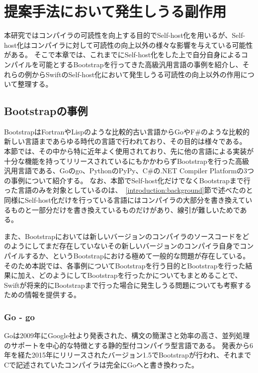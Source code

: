 \chapter{提案手法において発生しうる副作用}
\label{side-effect}

本研究ではコンパイラの可読性を向上する目的でSelf-host化を用いるが、Self-host化はコンパイラに対して可読性の向上以外の様々な影響を与えている可能性がある。
そこで本章では、これまでにSelf-host化をした上で自分自身によるコンパイルを可能とするBootstrapを行ってきた高級汎用言語の事例を紹介し、それらの例からSwiftのSelf-host化において発生しうる可読性の向上以外の作用について整理する。

\section{Bootstrapの事例}
\label{side-effect:instance}

BootstrapはFortranやLispのような比較的古い言語からGoやF\#のような比較的新しい言語まであらゆる時代の言語で行われており、その目的は様々である。
本節では、その中から特に近年よく使用されており、先に他の言語による実装が十分な機能を持ってリリースされているにもかかわらずBootstrapを行った高級汎用言語である、Goのgo、PythonのPyPy、C\#の.NET Compiler Platformの3つの事例について紹介する。
なお、本節でSelf-host化だけでなくBootstrapまで行った言語のみを対象としているのは、~\ref{introduction:background}節で述べたのと同様にSelf-host化だけを行っている言語にはコンパイラの大部分を書き換えているものと一部分だけを書き換えているものだけがあり、線引が難しいためである。

また、Bootstrapにおいては新しいバージョンのコンパイラのソースコードをどのようにしてまだ存在していないその新しいバージョンのコンパイラ自身でコンパイルするか、というBootstrapにおける極めて一般的な問題が存在している。
そのため本説では、各事例についてBootstrapを行う目的とBootstrapを行った結果に加え、どのようにしてBootstrapを行ったかについてもまとめることで、Swiftが将来的にBootstrapまで行った場合に発生しうる問題についても考察するための情報を提供する。

\subsection{Go - go}
\label{side-effect:instance:go}

Goは2009年にGoogle社より発表された、構文の簡潔さと効率の高さ、並列処理のサポートを中心的な特徴とする静的型付コンパイラ型言語である。
発表から6年を経た2015年にリリースされたバージョン1.5でBootstrapが行われ、それまでCで記述されていたコンパイラは完全にGoへと書き換わった。

